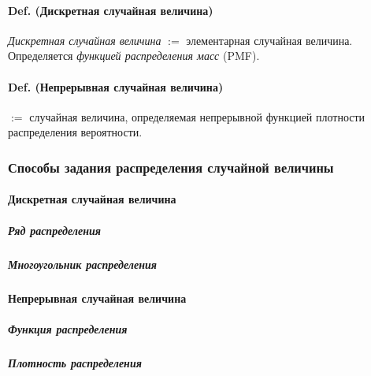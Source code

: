 \paragraph{Def. (Дискретная случайная
величина)}\label{def.-ux434ux438ux441ux43aux440ux435ux442ux43dux430ux44f-ux441ux43bux443ux447ux430ux439ux43dux430ux44f-ux432ux435ux43bux438ux447ux438ux43dux430}

\emph{Дискретная случайная величина} \(:=\) элементарная случайная
величина. Определяется \emph{функцией распределения масс} (PMF).

\paragraph{Def. (Непрерывная случайная
величина)}\label{def.-ux43dux435ux43fux440ux435ux440ux44bux432ux43dux430ux44f-ux441ux43bux443ux447ux430ux439ux43dux430ux44f-ux432ux435ux43bux438ux447ux438ux43dux430}

\(:=\) случайная величина, определяемая непрерывной функцией плотности
распределения вероятности.

\subsubsection{Способы задания распределения случайной
величины}\label{ux441ux43fux43eux441ux43eux431ux44b-ux437ux430ux434ux430ux43dux438ux44f-ux440ux430ux441ux43fux440ux435ux434ux435ux43bux435ux43dux438ux44f-ux441ux43bux443ux447ux430ux439ux43dux43eux439-ux432ux435ux43bux438ux447ux438ux43dux44b}

\paragraph{Дискретная случайная
величина}\label{ux434ux438ux441ux43aux440ux435ux442ux43dux430ux44f-ux441ux43bux443ux447ux430ux439ux43dux430ux44f-ux432ux435ux43bux438ux447ux438ux43dux430}

\subparagraph{Ряд
распределения}\label{ux440ux44fux434-ux440ux430ux441ux43fux440ux435ux434ux435ux43bux435ux43dux438ux44f}

\subparagraph{Многоугольник
распределения}\label{ux43cux43dux43eux433ux43eux443ux433ux43eux43bux44cux43dux438ux43a-ux440ux430ux441ux43fux440ux435ux434ux435ux43bux435ux43dux438ux44f}

\paragraph{Непрерывная случайная
величина}\label{ux43dux435ux43fux440ux435ux440ux44bux432ux43dux430ux44f-ux441ux43bux443ux447ux430ux439ux43dux430ux44f-ux432ux435ux43bux438ux447ux438ux43dux430}

\subparagraph{Функция
распределения}\label{ux444ux443ux43dux43aux446ux438ux44f-ux440ux430ux441ux43fux440ux435ux434ux435ux43bux435ux43dux438ux44f}

\subparagraph{Плотность
распределения}\label{ux43fux43bux43eux442ux43dux43eux441ux442ux44c-ux440ux430ux441ux43fux440ux435ux434ux435ux43bux435ux43dux438ux44f}
